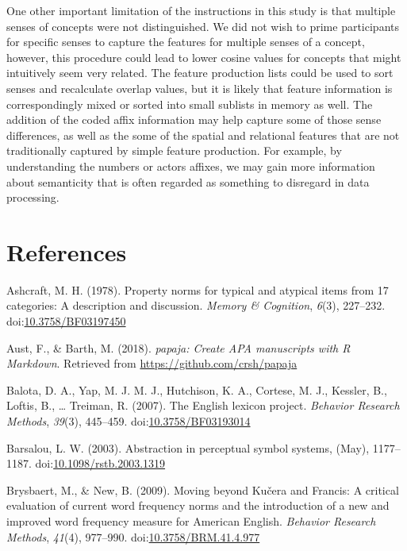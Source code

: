 \documentclass[english,man]{apa6}
\theoremstyle{definition}
\theoremstyle{definition}
\theoremstyle{definition}
\theoremstyle{remark}
\begin{document}
One other important limitation of the instructions in this study is that
multiple senses of concepts were not distinguished. We did not wish to
prime participants for specific senses to capture the features for
multiple senses of a concept, however, this procedure could lead to
lower cosine values for concepts that might intuitively seem very
related. The feature production lists could be used to sort senses and
recalculate overlap values, but it is likely that feature information is
correspondingly mixed or sorted into small sublists in memory as well.
The addition of the coded affix information may help capture some of
those sense differences, as well as the some of the spatial and
relational features that are not traditionally captured by simple
feature production. For example, by understanding the numbers or actors
affixes, we may gain more information about semanticity that is often
regarded as something to disregard in data processing.

\newpage

\section{References}\label{references}

\setlength{\parindent}{-0.5in} \setlength{\leftskip}{0.5in}

\hypertarget{refs}{}
\hypertarget{ref-Ashcraft1978a}{}
Ashcraft, M. H. (1978). Property norms for typical and atypical items
from 17 categories: A description and discussion. \emph{Memory \&
Cognition}, \emph{6}(3), 227--232.
doi:\href{https://doi.org/10.3758/BF03197450}{10.3758/BF03197450}

\hypertarget{ref-R-papaja}{}
Aust, F., \& Barth, M. (2018). \emph{papaja: Create APA manuscripts with
R Markdown}. Retrieved from \url{https://github.com/crsh/papaja}

\hypertarget{ref-Balota2007}{}
Balota, D. A., Yap, M. J. M. J., Hutchison, K. A., Cortese, M. J.,
Kessler, B., Loftis, B., \ldots{} Treiman, R. (2007). The English
lexicon project. \emph{Behavior Research Methods}, \emph{39}(3),
445--459.
doi:\href{https://doi.org/10.3758/BF03193014}{10.3758/BF03193014}

\hypertarget{ref-Barsalou2003}{}
Barsalou, L. W. (2003). Abstraction in perceptual symbol systems, (May),
1177--1187.
doi:\href{https://doi.org/10.1098/rstb.2003.1319}{10.1098/rstb.2003.1319}

\hypertarget{ref-Brysbaert2009}{}
Brysbaert, M., \& New, B. (2009). Moving beyond Kučera and Francis: A
critical evaluation of current word frequency norms and the introduction
of a new and improved word frequency measure for American English.
\emph{Behavior Research Methods}, \emph{41}(4), 977--990.
doi:\href{https://doi.org/10.3758/BRM.41.4.977}{10.3758/BRM.41.4.977}
\end{document}
